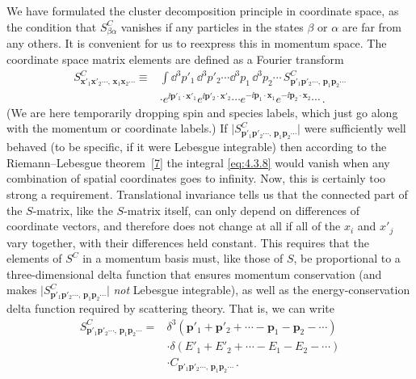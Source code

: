 We have formulated the cluster decomposition principle in coordinate
space, as the condition that $S^C_{\beta\alpha}$ vanishes if any particles in
the states $\beta$ or $\alpha$ are far from any others. It is convenient for us
to reexpress this in momentum space. The coordinate space matrix elements are
defined as a Fourier transform
\begin{equation}
\begin{aligned}
S^C_{\mathbf x'_1\mathbf x'_2\cdots,\,
     \mathbf x_1\mathbf x_2\cdots}
\equiv{}&\int \dd^3p'_1\,\dd^3p'_2\cdots \dd^3p_1\,\dd^3p_2\cdots\,
S^C_{\mathbf p'_1\mathbf p'_2\cdots,\,
     \mathbf p_1\mathbf p_2\cdots} \\
&\cdot e^{\ii\mathbf p'_1\cdot\mathbf x'_1}
e^{\ii\mathbf p'_2\cdot\mathbf x'_2}\cdots
e^{-\ii\mathbf p_1\cdot\mathbf x_1}
e^{-\ii\mathbf p_2\cdot\mathbf x_2}\cdots\,.
\end{aligned}
\tag{4.3.8}
\label{eq:4.3.8}
\end{equation}
(We are here temporarily dropping spin and species labels, which just go along
with the momentum or coordinate labels.) If
$\lvert S^C_{\mathbf p'_1\mathbf p'_2\cdots,\,
                 \mathbf p_1\mathbf p_2\cdots}\rvert$
were sufficiently well behaved (to be specific, if it were Lebesgue
integrable) then according to the Riemann--Lebesgue theorem~\hyperref[ref:4.7]{[7]} the integral
\eqref{eq:4.3.8} would vanish when any combination of spatial coordinates goes to
infinity. Now, this is certainly too strong a requirement. Translational
invariance tells us that the connected part of the $S$-matrix, like the
$S$-matrix itself, can only depend on differences of coordinate vectors, and
therefore does not change at all if all of the $x_i$ and $x'_j$ vary together,
with their differences held constant. This requires that the elements of
$S^C$ in a momentum basis must, like those of $S$, be proportional to a
three-dimensional delta function that ensures momentum conservation (and
makes
$\lvert S^C_{\mathbf p'_1\mathbf p'_2\cdots,\,
                 \mathbf p_1\mathbf p_2\cdots}\rvert$
\emph{not} Lebesgue integrable), as well as the energy-conservation delta
function required by scattering theory. That is, we can write
\begin{equation}
\begin{aligned}
S^C_{\mathbf p'_1\mathbf p'_2\cdots,\,
     \mathbf p_1\mathbf p_2\cdots}
={}&\delta^3(\mathbf p'_1+\mathbf p'_2+\cdots
             -\mathbf p_1-\mathbf p_2-\cdots) \\
&\cdot\delta(E'_1+E'_2+\cdots-E_1-E_2-\cdots) \\
&\cdot C_{\mathbf p'_1\mathbf p'_2\cdots,\,
  \mathbf p_1\mathbf p_2\cdots}\,.
\end{aligned}
\tag{4.3.9}
\label{eq:4.3.9}
\end{equation}
